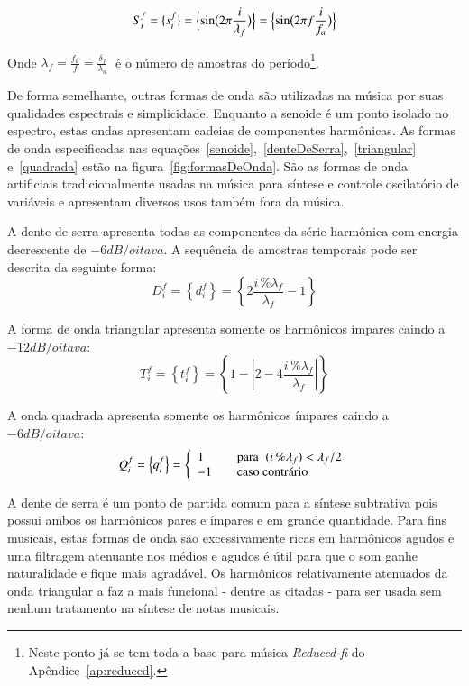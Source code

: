 \begin{equation}\label{senoide}
     S^f_i=\{ s^f_i \}=\Bigl\{ \sin\bigl(2\pi \frac{i}{\lambda_f} \bigr)  \Bigr\} = \Bigl\{ \sin\bigl(2\pi f \frac{i}{f_a}\bigr)  \Bigr\} 
\end{equation}

Onde $\lambda_f=\frac{f_a}{f}=\frac{\delta_f}{\lambda_a} \;$ é o número de amostras do período\footnote{Neste ponto já se tem toda a base para música \emph{Reduced-fi} do Apêndice~\ref{ap:reduced}.}.

De forma semelhante, outras formas de onda são utilizadas na música por suas qualidades
espectrais e simplicidade. Enquanto a senoide é um ponto isolado no espectro, estas 
ondas apresentam cadeias de componentes harmônicas.
As formas de onda especificadas nas equações~\ref{senoide},~\ref{denteDeSerra},~\ref{triangular} e~\ref{quadrada} estão na figura~\ref{fig:formasDeOnda}.
São as formas de onda artificiais tradicionalmente usadas na música para síntese e controle oscilatório de variáveis e apresentam diversos usos também fora da música.\cite{Openheim}

A dente de serra apresenta todas as componentes da série
harmônica com energia decrescente de $-6dB/oitava$. A sequência de amostras temporais pode ser descrita da seguinte forma:
\begin{equation}\label{denteDeSerra}
     D^f_i=\left\{ d^f_i \right\}=\left\{ 2\frac{i\,\%\lambda_f}{\lambda_f} -1 \right\}
\end{equation}

A forma de onda triangular apresenta somente os harmônicos ímpares caindo a $-12dB/oitava$:
\begin{equation}\label{triangular}
     T^f_i=\left\{ t^f_i \right\}=\left\{1- \left| 2 - 4\frac{i\,\%\lambda_f}{\lambda_f} \right| \right\}
\end{equation}

A onda quadrada apresenta somente os harmônicos ímpares caindo a $-6dB/oitava$:
\begin{equation}\label{quadrada}
     Q^f_i=\left\{ q^f_i \right\}= \left\{
         \begin{array}{l l}
              1 & \quad \text{para} \; \; (i\,\%\lambda_f)   <  \lambda_f /2  \\
              -1 & \quad \text{caso contrário}\\
         \end{array} \right.
\end{equation}

A dente de serra é um ponto de partida comum para a síntese subtrativa pois possui
ambos os harmônicos pares e ímpares e em grande quantidade. Para fins musicais, estas formas de onda são excessivamente ricas em harmônicos agudos e uma filtragem atenuante nos médios e agudos é útil para que o som ganhe naturalidade e fique mais agradável.
Os harmônicos relativamente atenuados da onda triangular
a faz a mais funcional - dentre as citadas - para ser usada sem nenhum tratamento na síntese de notas musicais.

